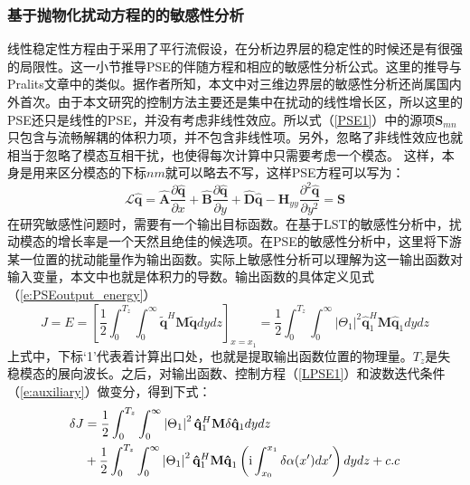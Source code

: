 \subsubsection{基于抛物化扰动方程的的敏感性分析}
线性稳定性方程由于采用了平行流假设，在分析边界层的稳定性的时候还是有很强的局限性。这一小节推导PSE的伴随方程和相应的敏感性分析公式。这里的推导与Pralits\cite{pralits2000sensitivity}文章中的类似。据作者所知，本文中对三维边界层的敏感性分析还尚属国内外首次。由于本文研究的控制方法主要还是集中在扰动的线性增长区，所以这里的PSE还只是线性的PSE，并没有考虑非线性效应。所以式（\ref{PSE1}）中的源项${\mathbf{S}}_{mn}$只包含与流畅解耦的体积力项，并不包含非线性项。另外，忽略了非线性效应也就相当于忽略了模态互相干扰，也使得每次计算中只需要考虑一个模态。 这样，本身是用来区分模态的下标$nm$就可以略去不写，这样PSE方程可以写为：
\begin{equation}
\label{LPSE1}
    \mathscr{L}{\mathbf{\hat q}}  = {\mathbf{\hat A}}\frac{{\partial {\mathbf{\hat q}} }}
    {{\partial x}} + {\mathbf{\hat B}}\frac{{\partial {\mathbf{\hat q}} }}
    {{\partial y}} + {\mathbf{\hat D\hat q}}  - {\mathbf{H}}_{yy} \frac{{\partial ^2 {\mathbf{\hat q}} }}
    {{\partial y^2 }} = {\mathbf{S}}
\end{equation}
在研究敏感性问题时，需要有一个输出目标函数。在基于LST的敏感性分析中，扰动模态的增长率是一个天然且绝佳的候选项。在PSE的敏感性分析中，这里将下游某一位置的扰动能量作为输出函数。实际上敏感性分析可以理解为这一输出函数对输入变量，本文中也就是体积力的导数。输出函数的具体定义见式（\ref{e:PSEoutput_energy}）
\begin{equation}
\label{e:PSEoutput_energy}
J = E = \left[ {\frac{1}
{2}\int_0^{T_z } {\int_0^\infty  {{\mathbf{\tilde q}}^H {\mathbf{M\tilde q}}dydz} } } \right]_{x = x_1 }  %
= \frac{1}
{2}\int_0^{T_z } {\int_0^\infty  {\left| {\Theta _1 } \right|^2 {\mathbf{\hat q}}_1 ^H {\mathbf{M\hat q}}_1 dydz} }
\end{equation}
上式中，下标`1'代表着计算出口处，也就是提取输出函数位置的物理量。$T_z$是失稳模态的展向波长。之后，对输出函数、控制方程（\ref{LPSE1}）和波数迭代条件（\ref{e:auxiliary}）做变分，得到下式：
\begin{equation}\label{e:bianfenJ}
\begin{aligned}
\delta J & = \frac{1}
{2}\int_0^{T_z } {\int_0^\infty  {\left| {\Theta _1 } \right|^2 {\mathbf{\hat q}}_1 ^H {\mathbf{M}}\delta {\mathbf{\hat q}}_1 dydz} }  \\
         &+ \frac{1}{2}\int_0^{T_z } {\int_0^\infty  {\left| {\Theta _1 } \right|^2 {\mathbf{\hat q}}_1 ^H {\mathbf{M\hat q}}_1 \left( {{\rm i}\int_{x_0 }^{x_1 } {\delta \alpha (x')dx'} } \right)dydz} }  + c.c \\
\end{aligned}
\end{equation}
